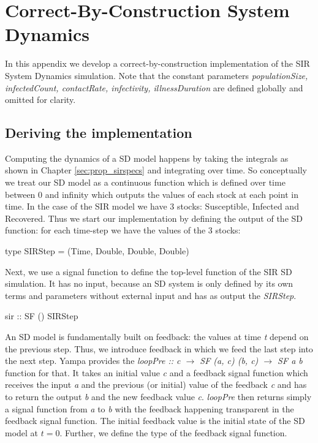 \chapter{Correct-By-Construction System Dynamics}
\label{app:sd_simulation}

In this appendix we develop a correct-by-construction implementation of the SIR System Dynamics simulation. Note that the constant parameters \textit{populationSize, infectedCount, contactRate, infectivity, illnessDuration} are defined globally and omitted for clarity.

\section{Deriving the implementation}
Computing the dynamics of a SD model happens by taking the integrals as shown in Chapter \ref{sec:prop_sirspecs} and integrating over time. So conceptually we treat our SD model as a continuous function which is defined over time between 0 and infinity which outputs the values of each stock at each point in time. In the case of the SIR model we have 3 stocks: Susceptible, Infected and Recovered. Thus we start our implementation by defining the output of the SD function: for each time-step we have the values of the 3 stocks:

\begin{HaskellCode}
type SIRStep = (Time, Double, Double, Double)
\end{HaskellCode}

Next, we use a signal function to define the top-level function of the SIR SD simulation. It has no input, because an SD system is only defined by its own terms and parameters without external input and has as output the \textit{SIRStep}.

\begin{HaskellCode}
sir :: SF () SIRStep
\end{HaskellCode}

An SD model is fundamentally built on feedback: the values at time \textit{t} depend on the previous step. Thus, we introduce feedback in which we feed the last step into the next step. Yampa provides the \textit{loopPre :: c $\to$ SF (a, c) (b, c) $\to$ SF a b} function for that. It takes an initial value \textit{c} and a feedback signal function which receives the input \textit{a} and the previous (or initial) value of the feedback \textit{c} and has to return the output \textit{b} and the new feedback value \textit{c}. \textit{loopPre} then returns simply a signal function from \textit{a} to \textit{b} with the feedback happening transparent in the feedback signal function. The initial feedback value is the initial state of the SD model at $t = 0$. Further, we define the type of the feedback signal function.

